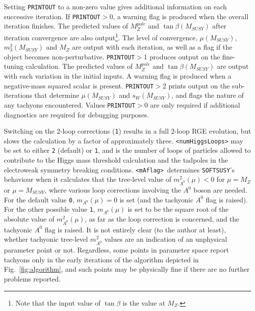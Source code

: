 \documentclass{article}
\def\SOFTSUSY{{\tt SOFTSUSY}}
\def\code#1{\small{\tt #1}\normalsize}
\begin{document}
Setting \code{PRINTOUT} to a non-zero value gives additional information
on 
each successive iteration. If \code{PRINTOUT}$>$0, a warning flag is
produced when the overall iteration 
finishes. The predicted values of $M_Z^{pole}$ and $\tan \beta(M_{SUSY})$ after
iteration convergence
are also output\footnote{Note that the input value of $\tan \beta$ is the
value at $M_Z$.}. The level of convergence, $\mu(M_{SUSY})$, $m_3^2(M_{SUSY})$ and $M_Z$
are output with each iteration, as well as a flag if the object becomes
non-perturbative. 
\code{PRINTOUT}$>$1 produces output on the fine-tuning calculation. The
predicted values of $M_Z^{pole}$ and $\tan \beta(M_{SUSY})$ are output with each
variation 
in the initial inputs. A warning flag is produced when a
negative-mass squared scalar is present.
\code{PRINTOUT}$>$2 prints output on the sub-iterations that determine
$\mu(M_{SUSY})$ and $s_W(M_{SUSY})$, and flags the nature of any tachyons
encountered. Values \code{PRINTOUT}$>$0 are only required
if additional diagnostics are required for debugging purposes.

Switching on the 2-loop
corrections (\code{1})
results in a full 2-loop RGE evolution, but slows the calculation by a factor 
of approximately three.
\code{<numHiggsLoops>} may be set to either \code{2} (default) or \code{1},
and is the number of loops of particles allowed to contribute to the Higgs
mass threshold calculation and the tadpoles in the electroweak symmetry
breaking conditions.
\code{<mAflag>}~determines \SOFTSUSY's behaviour when it calculates that the
tree-level value of $m_{A^0}^2(\mu)<0$ for $\mu=M_Z$ or $\mu=M_{SUSY}$, where
various loop corrections involving the 
$A^0$ boson are needed. For the default value \code{0}, $m_{A^0}(\mu)=0$ is
set (and the tachyonic $A^0$ flag is raised). For the other possible value
\code{1}, $m_{A^0}(\mu)$ is set to be the square root of the absolute value of
$m_{A^0}^2(\mu)$, as far as the loop correction is concerned, and the
tachyonic $A^0$ flag is raised. It is not entirely clear (to the author at
least), whether tachyonic tree-level $m_{A^0}^2$ values are an indication of
an unphysical parameter point or not. Regardless, some points in parameter
space report tachyons only in the 
early iterations of the algorithm depicted in Fig.~\ref{fig:algorithm},
 and such points may
be physically fine if there are no further problems reported. 
\end{document}
